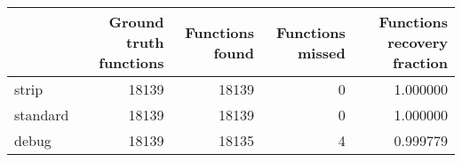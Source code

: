 \begin{tabular}{lrrrr}
\toprule
{} &  Ground truth functions &  Functions found &  Functions missed &  Functions recovery fraction \\
\midrule
strip    &                   18139 &            18139 &                 0 &                     1.000000 \\
standard &                   18139 &            18139 &                 0 &                     1.000000 \\
debug    &                   18139 &            18135 &                 4 &                     0.999779 \\
\bottomrule
\end{tabular}
